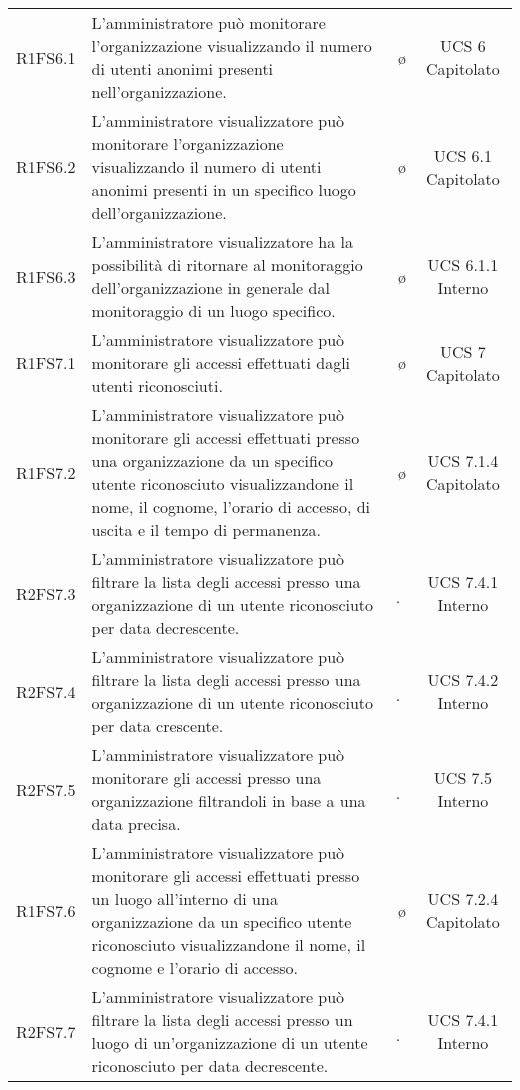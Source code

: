 {\begin{longtable}{ c C{6.5cm} c c}
R1FS6.1 & L'amministratore può monitorare l'organizzazione visualizzando il numero di utenti anonimi presenti nell'organizzazione. & \o & UCS 6 Capitolato\\

R1FS6.2 & L'amministratore visualizzatore può monitorare l'organizzazione visualizzando il numero di utenti anonimi presenti in un specifico luogo dell'organizzazione. & \o & UCS 6.1 Capitolato\\

R1FS6.3 & L'amministratore visualizzatore ha la possibilità di ritornare al monitoraggio dell'organizzazione in generale dal monitoraggio di un luogo specifico. & \o & UCS 6.1.1 Interno\\

R1FS7.1 & L'amministratore visualizzatore può monitorare gli accessi effettuati dagli utenti riconosciuti. & \o & UCS 7 Capitolato\\

R1FS7.2 & L'amministratore visualizzatore può monitorare gli accessi effettuati presso una organizzazione da un specifico utente riconosciuto visualizzandone il nome, il cognome, l'orario di accesso, di uscita e il tempo di permanenza. & \o & UCS 7.1.4 Capitolato\\

R2FS7.3 & L’amministratore visualizzatore può filtrare la lista degli accessi presso una organizzazione di un utente riconosciuto per data decrescente. & \d & UCS 7.4.1 Interno \\

R2FS7.4 & L’amministratore visualizzatore può filtrare la lista degli accessi presso una organizzazione  di un utente riconosciuto per data crescente. & \d & UCS 7.4.2 Interno \\

R2FS7.5 & L'amministratore visualizzatore può monitorare gli accessi presso una organizzazione filtrandoli in base a una data precisa. & \d & UCS 7.5 Interno\\

R1FS7.6 & L'amministratore visualizzatore può monitorare gli accessi effettuati presso un luogo all'interno di una organizzazione da un specifico utente riconosciuto visualizzandone il nome, il cognome e l'orario di accesso. & \o & UCS 7.2.4 Capitolato\\

R2FS7.7 & L’amministratore visualizzatore può filtrare la lista degli accessi presso un luogo di un'organizzazione di un utente riconosciuto per data decrescente. & \d & UCS 7.4.1 Interno \\


\end{longtable}}
